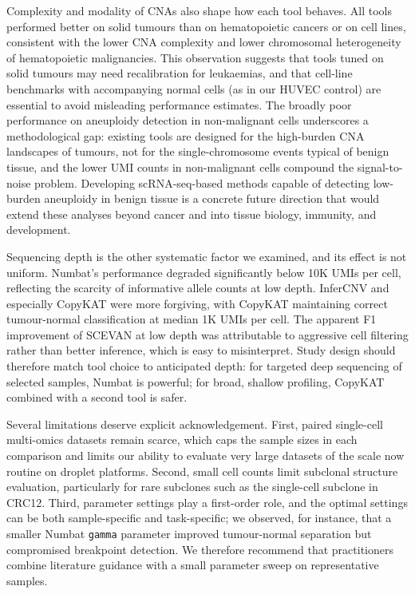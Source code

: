 \documentclass[11pt]{article}
\begin{document}
Complexity and modality of CNAs also shape how each tool behaves. All tools
performed better on solid tumours than on hematopoietic cancers or on cell
lines, consistent with the lower CNA complexity and lower chromosomal
heterogeneity of hematopoietic malignancies. This observation suggests that
tools tuned on solid tumours may need recalibration for leukaemias, and that
cell-line benchmarks with accompanying normal cells (as in our HUVEC
control) are essential to avoid misleading performance estimates. The
broadly poor performance on aneuploidy detection in non-malignant cells
underscores a methodological gap: existing tools are designed for the
high-burden CNA landscapes of tumours, not for the single-chromosome events
typical of benign tissue, and the lower UMI counts in non-malignant cells
compound the signal-to-noise problem. Developing scRNA-seq-based methods
capable of detecting low-burden aneuploidy in benign tissue is a concrete
future direction that would extend these analyses beyond cancer and into
tissue biology, immunity, and development.

Sequencing depth is the other systematic factor we examined, and its effect
is not uniform. Numbat's performance degraded significantly below 10K UMIs
per cell, reflecting the scarcity of informative allele counts at low
depth. InferCNV and especially CopyKAT were more forgiving, with CopyKAT
maintaining correct tumour-normal classification at median 1K UMIs per
cell. The apparent F1 improvement of SCEVAN at low depth was attributable to
aggressive cell filtering rather than better inference, which is easy to
misinterpret. Study design should therefore match tool choice to
anticipated depth: for targeted deep sequencing of selected samples, Numbat
is powerful; for broad, shallow profiling, CopyKAT combined with a second
tool is safer.

Several limitations deserve explicit acknowledgement. First, paired
single-cell multi-omics datasets remain scarce, which caps the sample sizes
in each comparison and limits our ability to evaluate very large datasets
of the scale now routine on droplet platforms. Second, small cell counts
limit subclonal structure evaluation, particularly for rare subclones such
as the single-cell subclone in CRC12. Third, parameter settings play a
first-order role, and the optimal settings can be both sample-specific and
task-specific; we observed, for instance, that a smaller Numbat
\texttt{gamma} parameter improved tumour-normal separation but compromised
breakpoint detection. We therefore recommend that practitioners combine
literature guidance with a small parameter sweep on representative samples.
\end{document}
